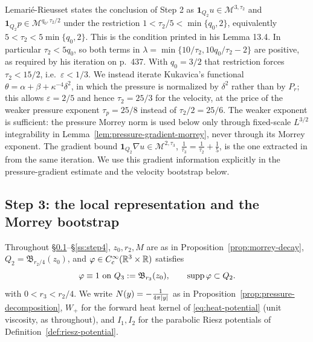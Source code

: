 \documentclass[11pt,reqno]{amsart}
\begin{document}
\begin{remark}
\label{rem:LR-pressure}
Lemarié-Rieusset states the conclusion of Step 2 as
$\mathbf{1}_{Q_{2}}u\in\mathcal{M}^{3,\tau_{2}}$ and
$\mathbf{1}_{Q_{2}}p\in\mathcal{M}^{q_{0},\tau_{2}/2}$ under the restriction
$1<\tau_{2}/5<\min\{q_{0},2\}$, equivalently
$5<\tau_{2}<5\min\{q_{0},2\}$. This is the condition printed in his
Lemma 13.4. In particular $\tau_2<5q_0$, so both terms in
$\lambda=\min\{10/\tau_{2},10q_{0}/\tau_{2}-2\}$ are positive,
as required by his iteration on p.~437. With $q_{0}=3/2$
that restriction forces $\tau_{2}<15/2$, i.e.\ $\varepsilon<1/3$. We instead
iterate Kukavica's functional $\theta=\alpha+\beta+\kappa^{-4}\delta^{2}$, in
which the pressure is normalized by $\delta^{2}$ rather than by $P_{r}$; this
allows $\varepsilon=2/5$ and hence $\tau_{2}=25/3$ for the velocity, at the
price of the weaker pressure exponent $\tau_{p}=25/8$ instead of
$\tau_{2}/2=25/6$. The weaker exponent is sufficient: the pressure Morrey norm
is used below only through fixed-scale $L^{3/2}$ integrability in
Lemma~\ref{lem:pressure-gradient-morrey}, never through its Morrey exponent. The gradient bound
$\mathbf{1}_{Q_{2}}\nabla u\in\mathcal{M}^{2,\tau_{3}}$,
$\tfrac1{\tau_{3}}=\tfrac1{\tau_{2}}+\tfrac15$, is the one extracted in
\cite[p.~439]{LemarieRieusset2016} from the same iteration. We use this
gradient information explicitly in the pressure-gradient estimate and the
velocity bootstrap below.
\end{remark}

\subsection{Step 3: the local representation and the Morrey bootstrap}\label{ss:step3}

Throughout \S\ref{ss:step3}--\S\ref{ss:step4}, $z_{0},r_{2},M$ are as in
Proposition~\ref{prop:morrey-decay}, $Q_{2}=\mathfrak{B}_{r_{2}/4}(z_{0})$, and
$\varphi\in C_{c}^{\infty}(\mathbb{R}^{3}\times\mathbb{R})$ satisfies
\begin{equation}\label{eq:phi-zeta}
  \varphi\equiv1\text{ on }Q_{3}:=\mathfrak{B}_{r_{3}}(z_{0}),
  \qquad
  \operatorname{supp}\varphi\subset Q_{2}.
\end{equation}
with $0<r_{3}<r_{2}/4$. We write $N(y)=-\tfrac1{4\pi\left\lvert y \right\rvert}$ as in
Proposition~\ref{prop:pressure-decomposition}, $W_{+}$ for the forward heat
kernel of \eqref{eq:heat-potential} (unit viscosity, as throughout), and
$I_{1},I_{2}$ for the parabolic Riesz potentials of
Definition~\ref{def:riesz-potential}.
\end{document}
